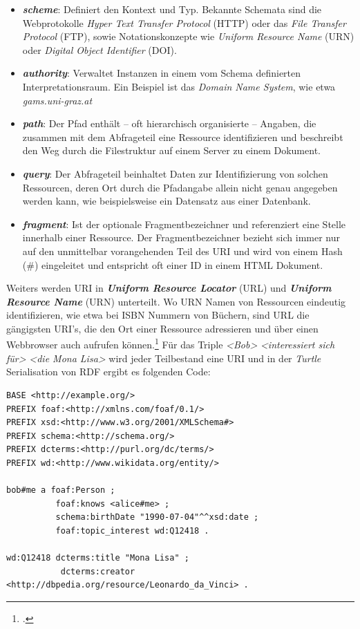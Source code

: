 \documentclass[12pt,a4paper]{article}
\begin{document}
\begin{itemize}
\item \textbf{\textit{scheme}}: Definiert den Kontext und Typ. Bekannte Schemata sind die Webprotokolle \textit{Hyper Text Transfer Protocol} (HTTP) oder das \textit{File Transfer Protocol} (FTP), sowie Notationskonzepte wie \textit{Uniform Resource Name} (URN) oder \textit{Digital Object Identifier} (DOI).
\item \textbf{\textit{authority}}: Verwaltet Instanzen in einem vom Schema definierten Interpretationsraum. Ein Beispiel ist das \textit{Domain Name System}, wie etwa \textit{gams.uni-graz.at}
\item \textbf{\textit{path}}: Der Pfad enthält – oft hierarchisch organisierte – Angaben, die zusammen mit dem Abfrageteil eine Ressource identifizieren und beschreibt den Weg durch die Filestruktur auf einem Server zu einem Dokument.
\item \textbf{\textit{query}}: Der Abfrageteil beinhaltet Daten zur Identifizierung von solchen Ressourcen, deren Ort durch die Pfadangabe allein nicht genau angegeben werden kann, wie beispielsweise ein Datensatz aus einer Datenbank.
\item \textbf{\textit{fragment}}: Ist der optionale Fragmentbezeichner und referenziert eine Stelle innerhalb einer Ressource. Der Fragmentbezeichner bezieht sich immer nur auf den unmittelbar vorangehenden Teil des URI und wird von einem Hash (\#) eingeleitet und entspricht oft einer ID in einem HTML Dokument.
\end{itemize}

Weiters werden URI in \textbf{\textit{Uniform Resource Locator}} (URL) und \textbf{\textit{Uniform Resource Name}} (URN) unterteilt. Wo URN Namen von Ressourcen eindeutig identifizieren, wie etwa bei ISBN Nummern von Büchern, sind URL die gängigsten URI's, die den Ort einer Ressource adressieren und über einen Webbrowser auch aufrufen können.\footcite[][S.21-22]{powers2003practical} Für das Triple \textit{<Bob>} \textit{<interessiert sich für>} \textit{<die Mona Lisa>} wird jeder Teilbestand eine URI und in der \textit{Turtle} Serialisation von RDF ergibt es folgenden Code:
\begin{lstlisting}[]
BASE <http://example.org/>
PREFIX foaf:<http://xmlns.com/foaf/0.1/>
PREFIX xsd:<http://www.w3.org/2001/XMLSchema#>
PREFIX schema:<http://schema.org/>
PREFIX dcterms:<http://purl.org/dc/terms/>
PREFIX wd:<http://www.wikidata.org/entity/>

bob#me a foaf:Person ;
          foaf:knows <alice#me> ;
          schema:birthDate "1990-07-04"^^xsd:date ;
          foaf:topic_interest wd:Q12418 .
 
wd:Q12418 dcterms:title "Mona Lisa" ;
           dcterms:creator <http://dbpedia.org/resource/Leonardo_da_Vinci> .
\end{lstlisting}
\end{document}
